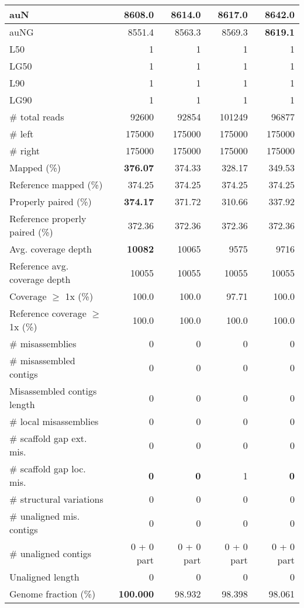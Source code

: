 \documentclass[12pt,a4paper]{article}
\begin{document}
\begin{table}[ht]
\begin{center}
\begin{tabular}{|l*{4}{|r}|}
auN & 8608.0 & 8614.0 & 8617.0 & {\bf 8642.0} \\ \hline
auNG & 8551.4 & 8563.3 & 8569.3 & {\bf 8619.1} \\ \hline
L50 & 1 & 1 & 1 & 1 \\ \hline
LG50 & 1 & 1 & 1 & 1 \\ \hline
L90 & 1 & 1 & 1 & 1 \\ \hline
LG90 & 1 & 1 & 1 & 1 \\ \hline
\# total reads & 92600 & 92854 & 101249 & 96877 \\ \hline
\# left & 175000 & 175000 & 175000 & 175000 \\ \hline
\# right & 175000 & 175000 & 175000 & 175000 \\ \hline
Mapped (\%) & {\bf 376.07} & 374.33 & 328.17 & 349.53 \\ \hline
Reference mapped (\%) & 374.25 & 374.25 & 374.25 & 374.25 \\ \hline
Properly paired (\%) & {\bf 374.17} & 371.72 & 310.66 & 337.92 \\ \hline
Reference properly paired (\%) & 372.36 & 372.36 & 372.36 & 372.36 \\ \hline
Avg. coverage depth & {\bf 10082} & 10065 & 9575 & 9716 \\ \hline
Reference avg. coverage depth & 10055 & 10055 & 10055 & 10055 \\ \hline
Coverage $\geq$ 1x (\%) & 100.0 & 100.0 & 97.71 & 100.0 \\ \hline
Reference coverage $\geq$ 1x (\%) & 100.0 & 100.0 & 100.0 & 100.0 \\ \hline
\# misassemblies & 0 & 0 & 0 & 0 \\ \hline
\# misassembled contigs & 0 & 0 & 0 & 0 \\ \hline
Misassembled contigs length & 0 & 0 & 0 & 0 \\ \hline
\# local misassemblies & 0 & 0 & 0 & 0 \\ \hline
\# scaffold gap ext. mis. & 0 & 0 & 0 & 0 \\ \hline
\# scaffold gap loc. mis. & {\bf 0} & {\bf 0} & 1 & {\bf 0} \\ \hline
\# structural variations & 0 & 0 & 0 & 0 \\ \hline
\# unaligned mis. contigs & 0 & 0 & 0 & 0 \\ \hline
\# unaligned contigs & 0 + 0 part & 0 + 0 part & 0 + 0 part & 0 + 0 part \\ \hline
Unaligned length & 0 & 0 & 0 & 0 \\ \hline
Genome fraction (\%) & {\bf 100.000} & 98.932 & 98.398 & 98.061 \\ \hline

\end{tabular}
\end{center}
\end{table}
\end{document}
